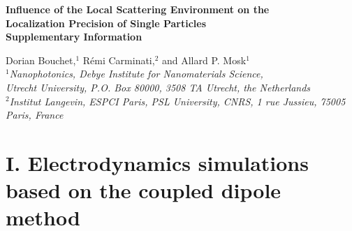 \documentclass[aps,prl,twocolumn,amsmath,amssymb,superscriptaddress,10pt,nobibnotes]{revtex4-2}
\newcommand{\beginsupplement}{%
        \setcounter{table}{0}
        \renewcommand{\thetable}{S\arabic{table}}%
        \setcounter{figure}{0}
        \renewcommand{\thefigure}{S\arabic{figure}}%
        \setcounter{section}{0}
        \renewcommand{\thesection}{\Roman{section}}
        \setcounter{equation}{0}
        \renewcommand{\theequation}{S\arabic{equation}}
     }
\begin{document}
\onecolumngrid
\clearpage
\beginsupplement
\begin{center}
\textbf{\large Influence of the Local Scattering Environment on the\\Localization Precision of Single Particles\\ \vspace{0.5cm} Supplementary Information}

\bigskip
Dorian Bouchet,$^1$ Rémi Carminati,$^2$ and Allard P. Mosk$^1$\\ \vspace{0.15cm}
\textit{\small $^\mathit{1}$Nanophotonics, Debye Institute for Nanomaterials Science,\\ Utrecht University, P.O. Box 80000, 3508 TA Utrecht, the Netherlands}\\
\textit{\small $^\mathit{2}$Institut Langevin, ESPCI Paris, PSL University, CNRS, 1 rue Jussieu, 75005 Paris, France}
\end{center}
\vspace{1cm}
\twocolumngrid

\section{I. Electrodynamics simulations based on the coupled dipole method}
\end{document}
